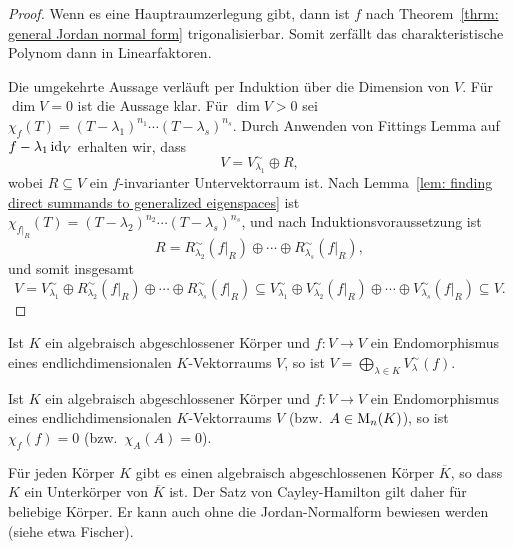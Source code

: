 \begin{proof}
  Wenn es eine Hauptraumzerlegung gibt, dann ist $f$ nach Theorem~\ref{thrm: general Jordan normal form} trigonalisierbar.
  Somit zerfällt das charakteristische Polynom dann in Linearfaktoren.
  
  Die umgekehrte Aussage verläuft per Induktion über die Dimension von $V$.
  Für $\dim V = 0$ ist die Aussage klar.
  Für $\dim V > 0$ sei $\chi_f(T) = (T - \lambda_1)^{n_1} \dotsm (T - \lambda_s)^{n_s}$.
  Durch Anwenden von Fittings Lemma auf $f - \lambda_1 \operatorname{id}_V$ erhalten wir, dass
  \[
    V = V^\sim_{\lambda_1} \oplus R,
  \]
  wobei $R \subseteq V$ ein $f$-invarianter Untervektorraum ist.
  Nach Lemma~\ref{lem: finding direct summands to generalized eigenspaces} ist $\chi_{f|_R}(T) = (T - \lambda_2)^{n_2} \dotsm (T - \lambda_s)^{n_s}$, und nach Induktionsvoraussetzung ist
  \[
    R = R^\sim_{\lambda_2}(f|_R) \oplus \dotsb \oplus R^\sim_{\lambda_s}(f|_R),
  \]
  und somit insgesamt
  \[
              V
    =         V^\sim_{\lambda_1} \oplus R^\sim_{\lambda_2}(f|_R) \oplus \dotsb \oplus R^\sim_{\lambda_s}(f|_R)
    \subseteq V^\sim_{\lambda_1} \oplus V^\sim_{\lambda_2}(f|_R) \oplus \dotsb \oplus V^\sim_{\lambda_s}(f|_R)
    \subseteq V.
  \]
\end{proof}


\begin{corollary}
  Ist $K$ ein algebraisch abgeschlossener Körper und $f \colon V \to V$ ein Endomorphismus eines endlichdimensionalen $K$-Vektorraums $V$, so ist $V = \bigoplus_{\lambda \in K} V^\sim_\lambda(f)$.
\end{corollary}


\begin{corollary}
  Ist $K$ ein algebraisch abgeschlossener Körper und $f \colon V \to V$ ein Endomorphismus eines endlichdimensionalen $K$-Vektorraums $V$ (bzw.\ $A \in \mathrm{M}_n(K)$), so ist $\chi_f(f) = 0$ (bzw.\ $\chi_A(A) = 0$).
\end{corollary}


\begin{remark}
  Für jeden Körper $K$ gibt es einen algebraisch abgeschlossenen Körper $\overline{K}$, so dass $K$ ein Unterkörper von $\overline{K}$ ist.
  Der Satz von Cayley-Hamilton gilt daher für beliebige Körper.
  Er kann auch ohne die Jordan-Normalform bewiesen werden (siehe etwa Fischer).
\end{remark}


